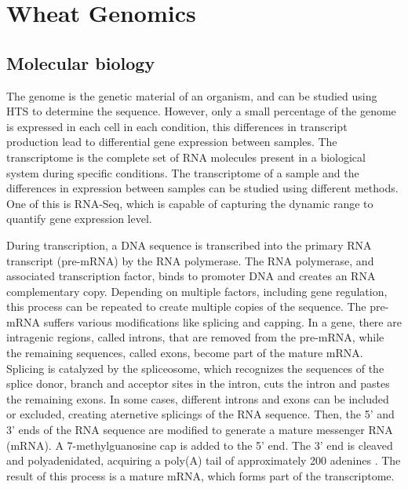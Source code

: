 
\section{Wheat Genomics}

\subsection{Molecular biology}
The genome is the genetic material of an organism, and can be studied using HTS to determine the sequence. 
However, only a small percentage of the genome is expressed in each cell in each condition, this differences in transcript production lead to differential gene expression between samples. 
The transcriptome is the complete set of RNA molecules present in a biological system during specific conditions\citep{wang2009rna}.  
The transcriptome of a sample and the differences in expression between samples can be studied using different methods. One of this is RNA-Seq, which is capable of capturing the dynamic range to quantify gene expression level\citep{Mortazavi2008}.

During transcription, a DNA sequence is transcribed into the primary RNA transcript (pre-mRNA) by the RNA polymerase. 
The RNA polymerase, and associated transcription factor, binds to promoter DNA and creates an RNA complementary copy. 
Depending on multiple factors, including gene regulation, this process can be repeated to create multiple copies of the sequence\citep{alberts2014molecular}.
The pre-mRNA suffers various modifications like splicing and capping. 
In a gene, there are  intragenic regions, called introns, that are removed from the pre-mRNA, while the remaining sequences, called exons, become part of the mature mRNA. 
Splicing is catalyzed by the spliceosome, which recognizes the sequences of the splice donor, branch and acceptor sites in the intron, cuts the intron and pastes the remaining exons.
In some cases, different introns and exons can be included or excluded, creating aternetive splicings of the RNA sequence\citep{alberts2014molecular}. 
Then, the 5' and 3' ends of the RNA sequence are modified to generate a mature messenger RNA (mRNA). 
A 7-methylguanosine cap is added to the 5' end. The 3' end is cleaved and polyadenidated, acquiring a poly(A) tail of approximately 200 adenines \citep{alberts2014molecular}. 
The result of this process is a mature mRNA, which forms part of the transcriptome.


